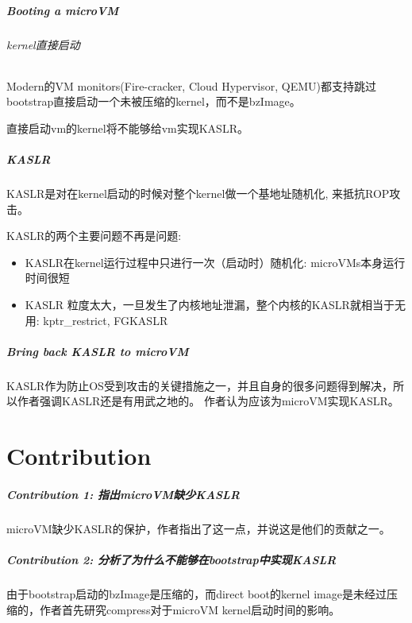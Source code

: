 \documentclass[
    aspectratio=169,  %
]{ctexbeamer}
\begin{document}
\begin{frame}
  \frametitle{Booting a microVM}
  \framesubtitle{kernel直接启动}

  Modern的VM monitors(Fire-cracker, Cloud Hypervisor, QEMU)都支持跳过bootstrap直接启动一个未被压缩的kernel，而不是bzImage。

直接启动vm的kernel将不能够给vm实现KASLR。
\end{frame}

\begin{frame}
  \frametitle{KASLR}
  KASLR是对在kernel启动的时候对整个kernel做一个基地址随机化, 来抵抗ROP攻击。

  KASLR的两个主要问题不再是问题:
  \begin{itemize}
    \item KASLR在kernel运行过程中只进行一次（启动时）随机化: microVMs本身运行时间很短
    \item KASLR 粒度太大，一旦发生了内核地址泄漏，整个内核的KASLR就相当于无用: kptr\_restrict, FGKASLR
  \end{itemize}
\end{frame}

\begin{frame}
  \frametitle{Bring back KASLR to microVM}

  KASLR作为防止OS受到攻击的关键措施之一，并且自身的很多问题得到解决，所以作者强调KASLR还是有用武之地的。
  作者认为应该为microVM实现KASLR。

\end{frame}

\part{Contribution}

\begin{frame}
  \frametitle{Contribution 1: 指出microVM缺少KASLR}
  microVM缺少KASLR的保护，作者指出了这一点，并说这是他们的贡献之一。
\end{frame}

\begin{frame}
  \frametitle{Contribution 2: 分析了为什么不能够在bootstrap中实现KASLR}
  由于bootstrap启动的bzImage是压缩的，而direct boot的kernel image是未经过压缩的，作者首先研究compress对于microVM kernel启动时间的影响。
\end{frame}
\end{document}
